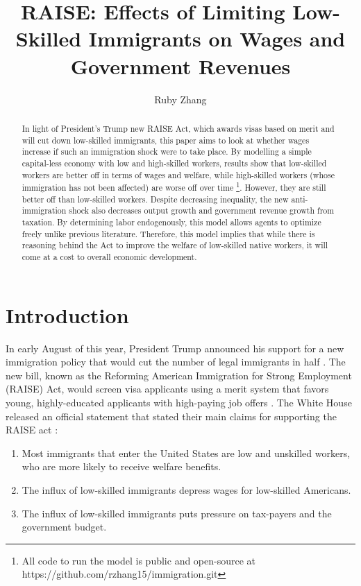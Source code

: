 \documentclass[11pt]{article}
\begin{document}
\title{RAISE: Effects of Limiting Low-Skilled Immigrants on Wages and Government Revenues}
\author{Ruby Zhang}
\maketitle

\begin{abstract}
  In light of President's Trump new RAISE Act, which awards visas based on merit and will cut down low-skilled immigrants, this paper aims to look at whether wages increase if such an immigration shock were to take place. By modelling a simple capital-less economy with low and high-skilled workers, results show that low-skilled workers are better off in terms of wages and welfare, while high-skilled workers (whose immigration has not been affected) are worse off over time \footnote{All code to run the model is public and open-source at https://github.com/rzhang15/immigration.git}. However, they are still better off than low-skilled workers. Despite decreasing inequality, the new anti-immigration shock also decreases output growth and government revenue growth from taxation. By determining labor endogenously, this model allows agents to optimize freely unlike previous literature. Therefore, this model implies that while there is reasoning behind the Act to improve the welfare of low-skilled native workers, it will come at a cost to overall economic development.
\end{abstract}

\pagebreak

\section{Introduction}

In early August of this year, President Trump announced his support for a new immigration policy that would cut the number of legal immigrants in half \cite{nytimes}. The new bill, known as the Reforming American Immigration for Strong Employment (RAISE) Act, would screen visa applicants using a merit system that favors young, highly-educated applicants with high-paying job offers \cite{timemag}. The White House released an official statement that stated their main claims for supporting the RAISE act \cite{whitehouse}:
\begin{enumerate}
  \item Most immigrants that enter the United States are low and unskilled workers, who are more likely to receive welfare benefits.
  \item The influx of low-skilled immigrants depress wages for low-skilled Americans.
  \item The influx of low-skilled immigrants puts pressure on tax-payers and the government budget.
\end{enumerate}
\end{document}
